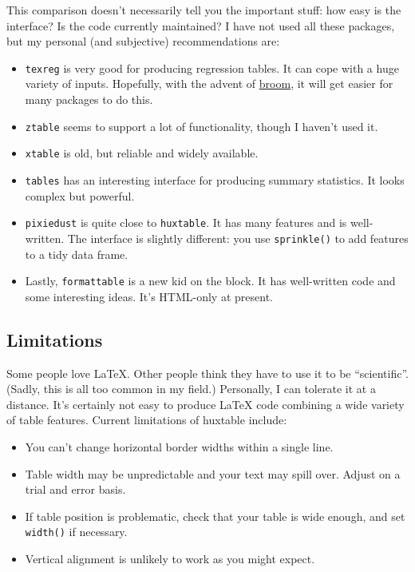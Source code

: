 \documentclass[]{article}
\providecommand{\tightlist}{%
  \setlength{\itemsep}{0pt}\setlength{\parskip}{0pt}}
\begin{document}
This comparison doesn't necessarily tell you the important stuff: how
easy is the interface? Is the code currently maintained? I have not used
all these packages, but my personal (and subjective) recommendations
are:

\begin{itemize}
\tightlist
\item
  \texttt{texreg} is very good for producing regression tables. It can
  cope with a huge variety of inputs. Hopefully, with the advent of
  \href{https://CRAN.R-project.org/package=broom}{broom}, it will get
  easier for many packages to do this.
\item
  \texttt{ztable} seems to support a lot of functionality, though I
  haven't used it.
\item
  \texttt{xtable} is old, but reliable and widely available.
\item
  \texttt{tables} has an interesting interface for producing summary
  statistics. It looks complex but powerful.
\item
  \texttt{pixiedust} is quite close to \texttt{huxtable}. It has many
  features and is well-written. The interface is slightly different: you
  use \texttt{sprinkle()} to add features to a tidy data frame.
\item
  Lastly, \texttt{formattable} is a new kid on the block. It has
  well-written code and some interesting ideas. It's HTML-only at
  present.
\end{itemize}

\subsection{Limitations}\label{limitations}

Some people love LaTeX. Other people think they have to use it to be
``scientific''. (Sadly, this is all too common in my field.) Personally,
I can tolerate it at a distance. It's certainly not easy to produce
LaTeX code combining a wide variety of table features. Current
limitations of huxtable include:

\begin{itemize}
\tightlist
\item
  You can't change horizontal border widths within a single line.
\item
  Table width may be unpredictable and your text may spill over. Adjust
  on a trial and error basis.
\item
  If table position is problematic, check that your table is wide
  enough, and set \texttt{width()} if necessary.
\item
  Vertical alignment is unlikely to work as you might expect.
\end{itemize}
\end{document}
